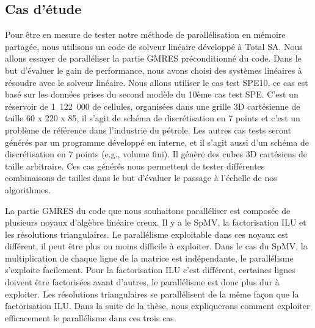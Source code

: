 \subsection{Cas d'étude}
Pour être en mesure de tester notre méthode de parallélisation en mémoire partagée, nous utilisons un code de solveur linéaire développé à Total SA.
%
Nous allons essayer de paralléliser la partie GMRES préconditionné du code.
%
Dans le but d'évaluer le gain de performance, nous avons choisi des systèmes linéaires à résoudre avec le solveur linéaire.
%
Nous allons utiliser le cas test SPE10, ce cas est basé sur les données prises du second modèle du 10ème cas test SPE\cite{SPE10}.
%
C'est un réservoir de 1~122~000 de cellules, organisées dans une grille 3D cartésienne de taille 60 x 220 x 85, il s'agit de schéma de discrétisation en 7 points et c'est un problème de référence dans l'industrie du pétrole.
%
Les autres cas tests seront générés par un programme développé en interne, et il s'agit aussi d'un schéma de discrétisation en 7 points (e.g., volume fini).
%
Il génère des cubes 3D cartésiens de taille arbitraire.
%
Ces cas générés nous permettent de tester différentes combinaisons de tailles dans le but d'évaluer le passage à l'échelle de nos algorithmes.


La partie GMRES du code que nous souhaitons paralléliser est composée de plusieurs noyaux d'algèbre linéaire creux.
%
Il y a le SpMV, la factorisation ILU et les résolutions triangulaires.
%
Le parallélisme exploitable dans ces noyaux est différent, il peut être plus ou moins difficile à exploiter.
%
Dans le cas du SpMV, la multiplication de chaque ligne de la matrice est indépendante, le parallélisme s'exploite facilement.
%
Pour la factorisation ILU c'est différent, certaines lignes doivent être factorisées avant d'autres, le parallélisme est donc plus dur à exploiter.
%
Les résolutions triangulaires se parallélisent de la même façon que la factorisation ILU.
%
Dans la suite de la thèse, nous expliquerons comment exploiter efficacement le parallélisme dans ces trois cas.

